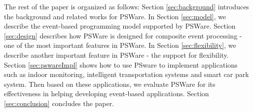 The rest of the paper is organized as follows: Section \ref{sec:background} introduces the background and related works for PSWare. In Section \ref{sec:model}, we describe the event-based programming model supported by PSWare. Section \ref{sec:design} describes how PSWare is designed for composite event processing - one of the most important features in PSWare. In Section \ref{sec:flexibility}, we describe another important feature in PSWare - the support for flexibility. Section \ref{sec:pswareImpl} shows how to use PSware to implement applications such as indoor monitoring, intelligent transportation systems and smart car park system. Then based on these applications, we evaluate PSWare for its effectiveness in helping developing event-based applications. Section \ref{sec:conclusion} concludes the paper.